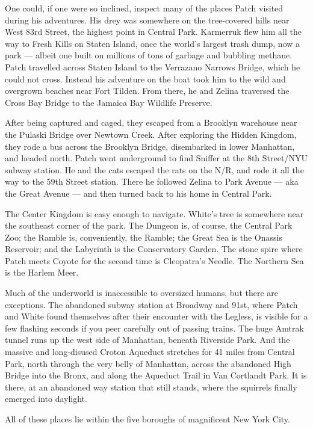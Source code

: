 \documentclass[ebook,oneside,openany,12pt]{memoir}
\begin{document}
One could, if one were so inclined, inspect many of the places Patch
visited during his adventures. His drey was somewhere on the
tree-covered hills near West 83rd Street, the highest point in Central
Park. Karmerruk flew him all the way to Fresh Kills on Staten Island,
once the world’s largest trash dump, now a park — albeit one built on
millions of tons of garbage and bubbling methane. Patch travelled
across Staten Island to the Verrazano Narrows Bridge, which he could
not cross. Instead his adventure on the boat took him to the wild and
overgrown beaches near Fort Tilden. From there, he and Zelina
traversed the Cross Bay Bridge to the Jamaica Bay Wildlife Preserve.

After being captured and caged, they escaped from a Brooklyn warehouse
near the Pulaski Bridge over Newtown Creek. After exploring the Hidden
Kingdom, they rode a bus across the Brooklyn Bridge, disembarked in
lower Manhattan, and headed north. Patch went underground to find
Sniffer at the 8th Street/NYU subway station. He and the cats escaped
the rats on the N/R, and rode it all the way to the 59th Street
station. There he followed Zelina to Park Avenue — aka the Great
Avenue — and then turned back to his home in Central Park.

The Center Kingdom is easy enough to navigate. White’s tree is
somewhere near the southeast corner of the park. The Dungeon is, of
course, the Central Park Zoo; the Ramble is, conveniently, the Ramble;
the Great Sea is the Onassis Reservoir; and the Labyrinth is the
Conservatory Garden. The stone spire where Patch meets Coyote for the
second time is Cleopatra’s Needle. The Northern Sea is the Harlem
Meer.

Much of the underworld is inaccessible to oversized humans, but there
are exceptions. The abandoned subway station at Broadway and
91st, where Patch and White found themselves after their
encounter with the Legless, is visible for a few flashing seconds if
you peer carefully out of passing trains. The huge Amtrak tunnel runs
up the west side of Manhattan, beneath Riverside Park. And the massive
and long-disused Croton Aqueduct stretches for 41 miles from Central
Park, north through the very belly of Manhattan, across the abandoned
High Bridge into the Bronx, and along the Aqueduct Trail in Van
Cortlandt Park. It is there, at an abandoned way station that still
stands, where the squirrels finally emerged into daylight.

All of these places lie within the five boroughs of magnificent New
York City.

\end{document}
